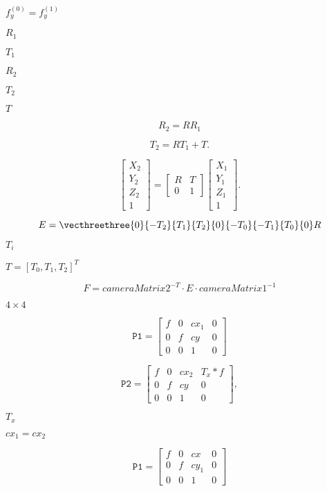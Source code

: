 \documentclass{article}
\begin{document}
$f^{(0)}_y=f^{(1)}_y$
\pagebreak

$R_1$
\pagebreak

$T_1$
\pagebreak

$R_2$
\pagebreak

$T_2$
\pagebreak

$T$
\pagebreak

\[R_2=R R_1\]
\pagebreak

\[T_2=R T_1 + T.\]
\pagebreak

\[\begin{bmatrix} X_2 \\ Y_2 \\ Z_2 \\ 1 \end{bmatrix} = \begin{bmatrix} R & T \\ 0 & 1 \end{bmatrix} \begin{bmatrix} X_1 \\ Y_1 \\ Z_1 \\ 1 \end{bmatrix}.\]
\pagebreak

\[E= \vecthreethree{0}{-T_2}{T_1}{T_2}{0}{-T_0}{-T_1}{T_0}{0} R\]
\pagebreak

$T_i$
\pagebreak

$T=[T_0, T_1, T_2]^T$
\pagebreak

\[F = cameraMatrix2^{-T}\cdot E \cdot cameraMatrix1^{-1}\]
\pagebreak

$4 \times 4$
\pagebreak

\[\texttt{P1} = \begin{bmatrix} f & 0 & cx_1 & 0 \\ 0 & f & cy & 0 \\ 0 & 0 & 1 & 0 \end{bmatrix}\]
\pagebreak

\[\texttt{P2} = \begin{bmatrix} f & 0 & cx_2 & T_x*f \\ 0 & f & cy & 0 \\ 0 & 0 & 1 & 0 \end{bmatrix} ,\]
\pagebreak

$T_x$
\pagebreak

$cx_1=cx_2$
\pagebreak

\[\texttt{P1} = \begin{bmatrix} f & 0 & cx & 0 \\ 0 & f & cy_1 & 0 \\ 0 & 0 & 1 & 0 \end{bmatrix}\]
\pagebreak
\end{document}
